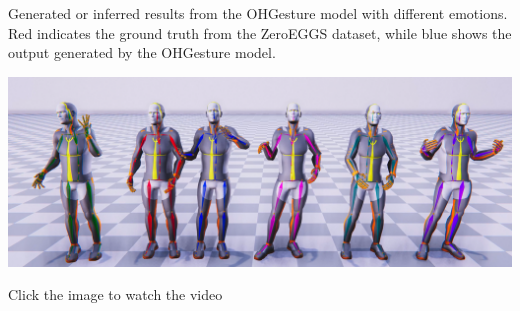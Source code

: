 Generated or inferred results from the OHGesture model with different emotions. Red indicates the ground truth from the ZeroEGGS dataset, while blue shows the output generated by the OHGesture model.

{
	\begin{center}
		\centering
		\href{https://youtu.be/eZghfNGmZn8}{%
			\includegraphics[width=\linewidth]{figures/ListOfEmotion}}
		
		{\tiny Click the image to watch the video}
	\end{center}
}

%
%
%
%

%
